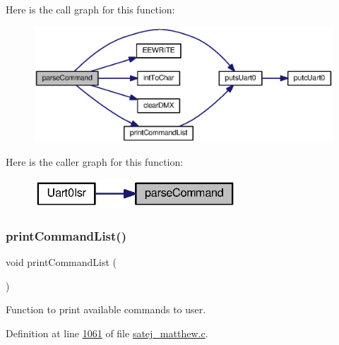 Here is the call graph for this function\+:\nopagebreak
\begin{figure}[H]
\begin{center}
\leavevmode
\includegraphics[width=350pt]{satej__matthew_8c_a784ef656236362513864c6ba3507e22d_cgraph}
\end{center}
\end{figure}
Here is the caller graph for this function\+:\nopagebreak
\begin{figure}[H]
\begin{center}
\leavevmode
\includegraphics[width=215pt]{satej__matthew_8c_a784ef656236362513864c6ba3507e22d_icgraph}
\end{center}
\end{figure}
\mbox{\label{satej__matthew_8c_a9657c6b2d1c183503ca49b71da13e9e4}} 
\subsubsection{\texorpdfstring{printCommandList()}{printCommandList()}}
{\footnotesize\ttfamily void print\+Command\+List (\begin{DoxyParamCaption}{ }\end{DoxyParamCaption})}



Function to print available commands to user. 



Definition at line \mbox{\hyperlink{satej__matthew_8c_source_l01061}{1061}} of file \mbox{\hyperlink{satej__matthew_8c_source}{satej\+\_\+matthew.\+c}}.

